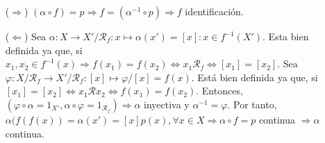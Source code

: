 \begin{dem}
  \begin{enumerate}[label=(\roman*)]
    \item [($\Rightarrow$)] $(\alpha \circ f) = p \Rightarrow f = (\alpha^{-1} \circ p) \Rightarrow f $ identificación.
    \item [($\Leftarrow$)] Sea $\alpha: X \to X' / \mathcal{R}_{f} : x \mapsto \alpha(x') = [x] : x \in f^{-1}(X')$. Esta bien definida ya que, si $x_{1}, x_{2} \in f^{-1}(x) \Rightarrow f(x_{1}) = f(x_{2}) \Leftrightarrow x_{1} \mathcal{R}_{f} \Leftrightarrow [x_{1}] = [x_{2}]$. Sea $\varphi: X / \mathcal{R}_{f} \to X' / \mathcal{R}_{f}: [x] \mapsto \varphi /[x] = f(x)$. Está bien definida ya que, si $[x_{1}] = [x_{2}] \Leftrightarrow x_{1} \mathcal{R} x_{2} \Leftrightarrow f(x_{1}) = f(x_{2})$. Entonces, $(\varphi \circ \alpha = 1_{X'}, \alpha \circ \varphi = 1_{\mathcal{R}_{f}}) \Rightarrow \alpha$ inyectiva y $\alpha^{-1}=\varphi$. Por tanto, $\alpha(f(f(x)) = \alpha(x') = [x] p(x), \forall x \in X \Rightarrow \alpha \circ f = p$ continua $\Rightarrow \alpha $ continua.
  \end{enumerate}  
\end{dem}
